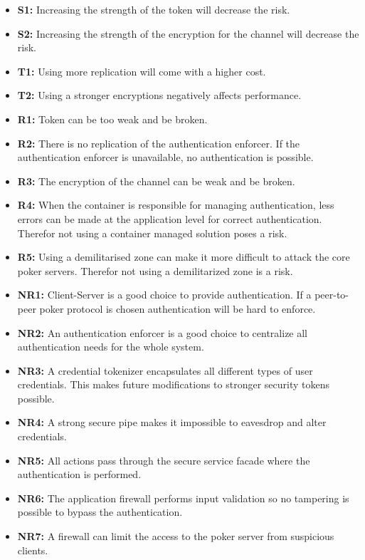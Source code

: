 \documentclass[a4paper,11pt]{report}
\begin{document}
\begin{itemize}
\item \textbf{S1:} Increasing the strength of the token will decrease the risk.
\item \textbf{S2:} Increasing the strength of the encryption for the channel will decrease the risk.
\item \textbf{T1:} Using more replication will come with a higher cost.
\item \textbf{T2:} Using a stronger encryptions negatively affects performance.
\item \textbf{R1:} Token can be too weak and be broken.
\item \textbf{R2:} There is no replication of the authentication enforcer. If the authentication enforcer is unavailable, no authentication is possible.
\item \textbf{R3:} The encryption of the channel can be weak and be broken.
\item \textbf{R4:} When the container is responsible for managing authentication, less errors can be made at the application level for correct authentication. Therefor not using a container managed solution poses a risk.
\item \textbf{R5:} Using a demilitarised zone can make it more difficult to attack the core poker servers. Therefor not using a demilitarized zone is a risk.
\item \textbf{NR1:} Client-Server is a good choice to provide authentication. If a peer-to-peer poker protocol is chosen authentication will be hard to enforce.
\item \textbf{NR2:} An authentication enforcer is a good choice to centralize all authentication needs for the whole system.
\item \textbf{NR3:} A credential tokenizer encapsulates all different types of user credentials. This makes future modifications to stronger security tokens possible.
\item \textbf{NR4:} A strong secure pipe makes it impossible to eavesdrop and alter credentials. 
\item \textbf{NR5:} All actions pass through the secure service facade where the authentication is performed.
\item \textbf{NR6:} The application firewall performs input validation so no tampering is possible to bypass the authentication.
\item \textbf{NR7:} A firewall can limit the access to the poker server from suspicious clients.
\end{itemize}
\end{document}

